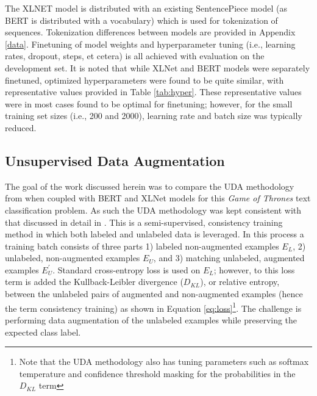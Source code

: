 \documentclass[twoside,twocolumn,10pt]{article}
\begin{document}
 The XLNET model is distributed with an existing SentencePiece model (as BERT is distributed with a vocabulary) which is used for tokenization of sequences. Tokenization differences between models are provided in Appendix \ref{data}.  Finetuning of model weights and hyperparameter tuning (i.e., learning rates, dropout, steps, et cetera) is all achieved with evaluation on the development set. It is noted that while XLNet and BERT models were separately finetuned, optimized hyperparameters were found to be quite similar, with representative values provided in Table \ref{tab:hyper}. These representative values were in most cases found to be optimal for finetuning; however, for the small training set sizes (i.e., 200 and 2000), learning rate and batch size was typically reduced.

 \begin{table}
 	\caption{Comparison of Optimized Hyperparameters}\label{tab:hyper}
 	\centering
 \end{table} 

 
 \subsection{Unsupervised Data Augmentation}
The goal of the work discussed herein was to compare the UDA methodology from \cite{Xie:2019} when coupled with BERT and XLNet models for this {\it Game of Thrones} text classification problem. As such the UDA methodology was kept consistent with that discussed in detail in \cite{Xie:2019}. This is a semi-supervised, consistency training method in which both labeled and unlabeled data is leveraged. In this process a training batch consists of three parts 1) labeled non-augmented examples $E_{L}$, 2) unlabeled, non-augmented examples $E_{U}$, and 3) matching unlabeled, augmented examples $E^{\prime}_{U}$. Standard cross-entropy loss is used on $E_{L}$; however, to this loss term is added the Kullback-Leibler divergence ($D_{KL}$), or relative entropy, between the unlabeled pairs of augmented and non-augmented examples (hence the term consistency training) as shown in Equation \ref{eq:loss}\footnote{Note that the UDA methodology also has tuning parameters such as softmax temperature and confidence threshold masking for the probabilities in the $D_{KL}$ term}. The challenge is performing data augmentation of the unlabeled examples while preserving the expected class label.
\end{document}

